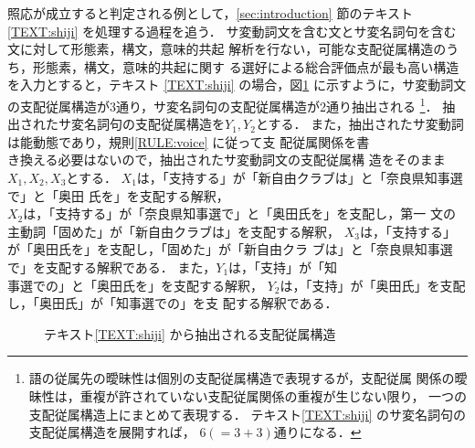 照応が成立すると判定される例として，\ref{sec:introduction} 節のテキスト
\ref{TEXT:shiji} を処理する過程を追う．
サ変動詞文を含む文とサ変名詞句を含む文に対して形態素，構文，意味的共起
解析を行ない，可能な支配従属構造のうち，形態素，構文，意味的共起に関す
る選好による総合評価点が最も高い構造を入力とすると，テキスト
\ref{TEXT:shiji} の場合，図\ref{fig:depstruct} に示すように，サ変動詞文
の支配従属構造が3通り，サ変名詞句の支配従属構造が2通り抽出される
\footnote{語の従属先の曖昧性は個別の支配従属構造で表現するが，支配従属
関係の曖昧性は，重複が許されていない支配従属関係の重複が生じない限り，
一つの支配従属構造上にまとめて表現する．
テキスト\ref{TEXT:shiji} のサ変名詞句の支配従属構造を展開すれば，
$6(=3+3)$通りになる．}．
抽出されたサ変名詞句の支配従属構造を$Y_1, Y_2$とする．\hspace*{0.2mm}
また，\hspace*{0.2mm}抽出されたサ変動詞は能動態であり，\hspace*{0.2mm}規則\ref{RULE:voice} に従って支\hspace*{0.2mm}
配\hspace*{0.2mm}従\hspace*{0.2mm}属\hspace*{0.2mm}関\hspace*{0.2mm}係を書\\き換える必要はないので，抽出されたサ変動詞文の支配従属構
造をそのまま$X_1, X_2, X_3$とする．
$X_1$は，「支持する」が「新自由クラブは」と「奈良県知事選で」と「奥田
氏を」を支配する解釈，\\
$X_2$は，「支持する」が「奈良県知事選で」と「奥田氏を」を支配し，第一
文の主動詞「固めた」が「新自由クラブは」を支配する解釈，
$X_3$は，「支持する」が「奥田氏を」を支配し，「固めた」が「新自由クラ
ブは」と「奈良県知事選で」を支配する解釈である．
また，$Y_1$は，「支持」が「知\\事選での」と「奥田氏を」を支配する解釈，
$Y_2$は，「支持」が「奥田氏」を支配し，「奥田氏」が「知事選での」を支
配する解釈である．
\begin{figure}[htbp]
\begin{center}
\vspace*{-4mm}
\vspace*{-2mm}
\end{center}
\vspace*{-2mm}
\caption{テキスト\protect\ref{TEXT:shiji} から抽出される支配従属構造}
\label{fig:depstruct}
\end{figure}

